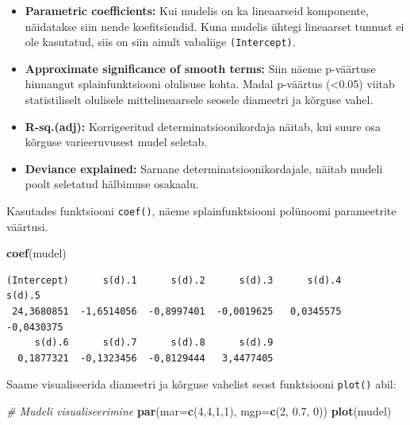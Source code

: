 \documentclass[
]{book}
\newenvironment{Shaded}{\begin{snugshade}}{\end{snugshade}}
\newcommand{\AttributeTok}[1]{\textcolor[rgb]{0.13,0.29,0.53}{#1}}
\newcommand{\CommentTok}[1]{\textcolor[rgb]{0.56,0.35,0.01}{\textit{#1}}}
\newcommand{\DecValTok}[1]{\textcolor[rgb]{0.00,0.00,0.81}{#1}}
\newcommand{\FloatTok}[1]{\textcolor[rgb]{0.00,0.00,0.81}{#1}}
\newcommand{\FunctionTok}[1]{\textcolor[rgb]{0.13,0.29,0.53}{\textbf{#1}}}
\newcommand{\NormalTok}[1]{#1}
\providecommand{\tightlist}{%
  \setlength{\itemsep}{0pt}\setlength{\parskip}{0pt}}
\renewenvironment{Shaded} {\begin{snugshade}\footnotesize} {\end{snugshade}}
\begin{document}
\begin{itemize}
\tightlist
\item
  \textbf{Parametric coefficients:} Kui mudelis on ka lineaarseid komponente, näidatakse siin nende koefitsiendid. Kuna mudelis ühtegi lineaarset tunnust ei ole kasutatud, siis on siin ainult vabaliige \texttt{(Intercept)}.
\item
  \textbf{Approximate significance of smooth terms:} Siin näeme p-väärtuse hinnangut splainfunktsiooni olulisuse kohta. Madal p-väärtus (\textless0.05) viitab statistiliselt olulisele mittelineaarsele seosele diameetri ja kõrguse vahel.
\item
  \textbf{R-sq.(adj):} Korrigeeritud determinatsioonikordaja näitab, kui suure osa kõrguse varieeruvusest mudel seletab.
\item
  \textbf{Deviance explained:} Sarnane determinatsioonikordajale, näitab mudeli poolt seletatud hälbimuse osakaalu.
\end{itemize}

Kasutades funktsiooni \texttt{coef()}, näeme splainfunktsiooni polünoomi parameetrite väärtusi.

\begin{Shaded}
\begin{Highlighting}[]
\FunctionTok{coef}\NormalTok{(mudel)}
\end{Highlighting}
\end{Shaded}

\begin{verbatim}
(Intercept)      s(d).1      s(d).2      s(d).3      s(d).4      s(d).5 
 24,3680851  -1,6514056  -0,8997401  -0,0019625   0,0345575  -0,0430375 
     s(d).6      s(d).7      s(d).8      s(d).9 
  0,1877321  -0,1323456  -0,8129444   3,4477405 
\end{verbatim}

Saame visualiseerida diameetri ja kõrguse vahelist seost funktsiooni \texttt{plot()} abil:

\begin{Shaded}
\begin{Highlighting}[]
\CommentTok{\# Mudeli visualiseerimine}
\FunctionTok{par}\NormalTok{(}\AttributeTok{mar=}\FunctionTok{c}\NormalTok{(}\DecValTok{4}\NormalTok{,}\DecValTok{4}\NormalTok{,}\DecValTok{1}\NormalTok{,}\DecValTok{1}\NormalTok{), }\AttributeTok{mgp=}\FunctionTok{c}\NormalTok{(}\DecValTok{2}\NormalTok{, }\FloatTok{0.7}\NormalTok{, }\DecValTok{0}\NormalTok{))}
\FunctionTok{plot}\NormalTok{(mudel)}
\end{Highlighting}
\end{Shaded}
\end{document}
